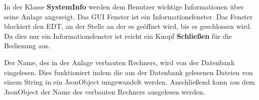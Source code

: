 In der Klasse \textbf{SystemInfo} werden dem Benutzer wichtige Informationen über seine Anlage angezeigt. Das \ac{GUI} Fenster ist ein Informationsfenster. Das Fenster blockiert den \ac{EDT}, an der Stelle an der es geöffnet wird, bis es geschlossen wird. Da dies nur ein Informationsfenster ist reicht ein Knopf \textbf{Schließen} für die Bedienung aus.

\vspace{10pt}

\vspace{10pt}

Der Name, des in der Anlage verbauten Rechners, wird von der Datenbank eingelesen. Dies funktioniert indem die aus der Datenbank gelesenen Dateien von einem String in ein JsonObject umgewandelt werden. Anschließend kann aus dem JsonObject der Name des verbauten Rechners ausgelesen werden.

\vspace{50pt}


